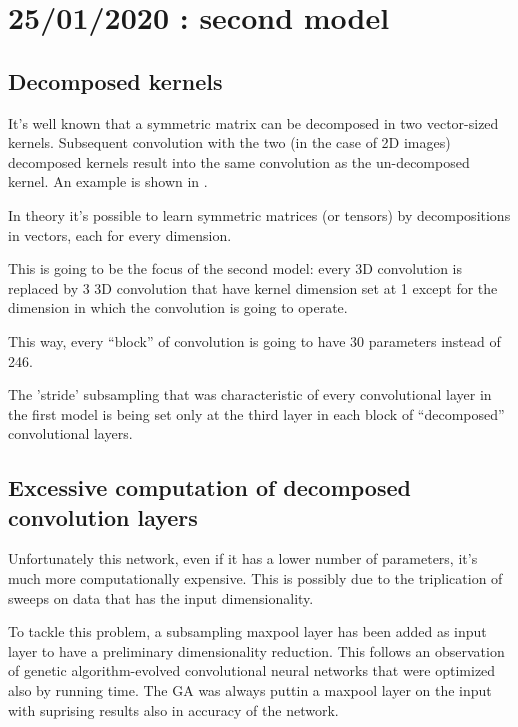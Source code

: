 \section{25/01/2020 : second model}

\subsection{Decomposed kernels}

It's well known that a symmetric matrix can be decomposed in two vector-sized kernels.
Subsequent convolution with the two (in the case of 2D images) decomposed kernels
result into the same convolution as the un-decomposed kernel.
An example is shown in \cite{Sobel}.

In theory it's possible to learn symmetric matrices (or tensors) by decompositions
in vectors, each for every dimension.

This is going to be the focus of the second model: every 3D convolution is
replaced by 3 3D convolution that have kernel dimension set at 1 except for the
dimension in which the convolution is going to operate.

This way, every ``block'' of convolution is going to have 30 parameters instead of 246.

The 'stride' subsampling that was characteristic of every convolutional layer
in the first model is being set only at the third layer in each block of
``decomposed'' convolutional layers.

\subsection{Excessive computation of decomposed convolution layers}

Unfortunately this network, even if it has a lower number of parameters,
it's much more computationally expensive.
This is possibly due to the triplication of sweeps on data that has the input 
dimensionality.

To tackle this problem, a subsampling maxpool layer has been added as input layer to
have a preliminary dimensionality reduction.
This follows an observation of genetic algorithm-evolved convolutional neural networks
that were optimized also by running time. The GA was always puttin a maxpool layer
on the input with suprising results also in accuracy of the network.
